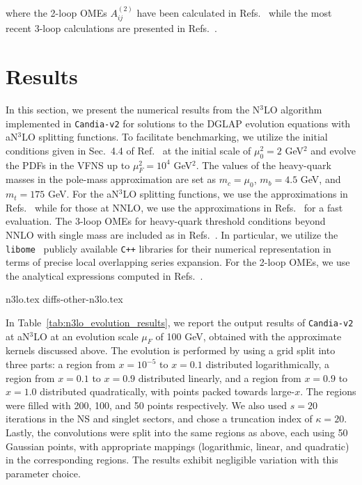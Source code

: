 \documentclass[12pt,notitlepage,aps,preprintnumbers,superscriptaddress,nofootinbib,aps,prd,floatfix]{revtex4-2}
\begin{document}
where the 2-loop OMEs $A^{(2)}_{ij}$ have been calculated in Refs.~\cite{Buza:1995ie,Buza:1996wv} while the most recent 3-loop calculations are presented in Refs.~\cite{Ablinger:2025nnq,Ablinger:2025joi,Ablinger:2024qxg,Ablinger:2024xtt,Ablinger:2023ahe,Bierenbaum:2022biv,Ablinger:2022wbb,Behring:2021asx,Ablinger:2020snj,Ablinger:2019etw,Ablinger:2018brx,Ablinger:2017xml,Ablinger:2017err,Ablinger:2014tla,Ablinger:2014uka,Behring:2014eya,transitionAqg,Ablinger:2012qm,Blumlein:2012vq,Blumlein:2011mi,Ablinger:2010ty,Bierenbaum:2009zt,Bierenbaum:2008yu,Bierenbaum:2007qe,Bierenbaum:2007dm,Behring:2025avs}.



\section{Results}
\label{results}

In this section, we present the numerical results from the N$^3$LO algorithm implemented in \texttt{Candia-v2} for solutions to the DGLAP evolution equations with aN$^3$LO splitting functions.
%
To facilitate benchmarking, we utilize the initial conditions given in Sec.~4.4 of Ref.~\cite{Dittmar:2005ed} at the initial scale of $\mu^2_0=2$ GeV$^2$ and evolve the PDFs in the VFNS up to $\mu_F^2 = 10^4$ GeV$^2$. The values of the heavy-quark masses in the pole-mass approximation are set as $m_c=\mu_0$, $m_b=4.5$ GeV, and $m_t=175$ GeV. For the aN$^3$LO splitting functions, we use the approximations in Refs.~\cite{Davies:2022ofz,Moch:2021qrk,Falcioni:2023luc,Falcioni:2023vqq,Moch:2023tdj,Falcioni:2024xyt,Falcioni:2024qpd} while for those at NNLO, we use the approximations in Refs.~\cite{Moch:2004pa,Vogt:2004mw} for a fast evaluation. The 3-loop OMEs for heavy-quark threshold conditions beyond NNLO with single mass are included as in Refs.~\cite{Ablinger:2025joi,Ablinger:2024xtt}. In particular, we utilize the \texttt{libome}~\cite{Ablinger:2025joi,libome}  publicly available \texttt{C++} libraries for their numerical representation in terms of
precise local overlapping series expansion. 
For the 2-loop OMEs, we use the analytical expressions computed in Refs.~\cite{Buza:1995ie,Buza:1996wv}.  

{n3lo.tex}
{diffs-other-n3lo.tex}

In Table~\ref{tab:n3lo_evolution_results}, we report the output results of \texttt{Candia-v2} at aN$^3$LO at an evolution scale $\mu_F$ of 100 GeV, obtained with the approximate kernels discussed above.
The evolution is performed by using a grid split into three parts: a region from $x=10^{-5}$ to $x=0.1$ distributed logarithmically, a region from $x=0.1$ to $x=0.9$ distributed linearly, and a region from $x=0.9$ to $x=1.0$ distributed quadratically, with points packed towards large-$x$. The regions were filled with 200, 100, and 50 points respectively. We also used $s=20$ iterations in the NS and singlet sectors, and chose a truncation index of $\kappa=20$. Lastly, the convolutions were split into the same regions as above, each using 50 Gaussian points, with appropriate mappings (logarithmic, linear, and quadratic) in the corresponding regions. The results exhibit negligible variation with this parameter choice.
\end{document}
